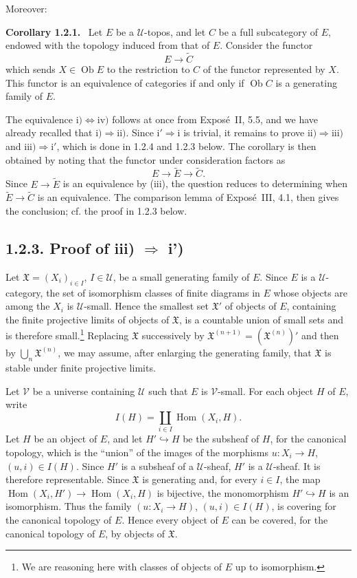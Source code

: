 \documentclass[11pt]{article}
\newcommand{\U}{\mathcal{U}}
\newcommand{\V}{\mathcal{V}}
\newcommand{\Hom}{\operatorname{Hom}}
\newcommand{\Ob}{\operatorname{Ob}}
\newenvironment{statement}[1]{\par\medskip\noindent\textbf{#1.}\ }{\par\medskip}
\begin{document}
Moreover:

\begin{statement}{Corollary 1.2.1}
Let \(E\) be a \(\U\)-topos, and let \(C\) be a full subcategory of \(E\), endowed with the topology induced from that of \(E\). Consider the functor
\[
E\longrightarrow \widetilde C
\]
which sends \(X\in\Ob E\) to the restriction to \(C\) of the functor represented by \(X\). This functor is an equivalence of categories if and only if \(\Ob C\) is a generating family of \(E\).
\end{statement}

The equivalence \(\mathrm{i)}\Leftrightarrow\mathrm{iv)}\) follows at once from Expos\'e~II, 5.5, and we have already recalled that \(\mathrm{i)}\Rightarrow\mathrm{ii)}\). Since \(\mathrm{i'}\Rightarrow\mathrm{i}\) is trivial, it remains to prove \(\mathrm{ii)}\Rightarrow\mathrm{iii)}\) and \(\mathrm{iii)}\Rightarrow\mathrm{i'}\), which is done in 1.2.4 and 1.2.3 below. The corollary is then obtained by noting that the functor under consideration factors as
\[
E\longrightarrow \widetilde E\longrightarrow \widetilde C.
\]
Since \(E\to\widetilde E\) is an equivalence by (iii), the question reduces to determining when \(\widetilde E\to\widetilde C\) is an equivalence. The comparison lemma of Expos\'e~III, 4.1, then gives the conclusion; cf. the proof in 1.2.3 below.

\subsection*{1.2.3. Proof of iii) \(\Rightarrow\) i')}
Let \(\mathfrak X=(X_i)_{i\in I}\), \(I\in\U\), be a small generating family of \(E\). Since \(E\) is a \(\U\)-category, the set of isomorphism classes of finite diagrams in \(E\) whose objects are among the \(X_i\) is \(\U\)-small. Hence the smallest set \(\mathfrak X'\) of objects of \(E\), containing the finite projective limits of objects of \(\mathfrak X\), is a countable union of small sets and is therefore small.\footnote{We are reasoning here with classes of objects of \(E\) up to isomorphism.} Replacing \(\mathfrak X\) successively by \(\mathfrak X^{(n+1)}=(\mathfrak X^{(n)})'\) and then by \(\bigcup_n\mathfrak X^{(n)}\), we may assume, after enlarging the generating family, that \(\mathfrak X\) is stable under finite projective limits.

Let \(\V\) be a universe containing \(\U\) such that \(E\) is \(\V\)-small. For each object \(H\) of \(E\), write
\[
I(H)=\coprod_{i\in I}\Hom(X_i,H).
\]
Let \(H\) be an object of \(E\), and let \(H'\hookrightarrow H\) be the subsheaf of \(H\), for the canonical topology, which is the ``union'' of the images of the morphisms \(u:X_i\to H\), \((u,i)\in I(H)\). Since \(H'\) is a subsheaf of a \(\U\)-sheaf, \(H'\) is a \(\U\)-sheaf. It is therefore representable. Since \(\mathfrak X\) is generating and, for every \(i\in I\), the map \(\Hom(X_i,H')\to\Hom(X_i,H)\) is bijective, the monomorphism \(H'\hookrightarrow H\) is an isomorphism. Thus the family \((u:X_i\to H)\), \((u,i)\in I(H)\), is covering for the canonical topology of \(E\). Hence every object of \(E\) can be covered, for the canonical topology of \(E\), by objects of \(\mathfrak X\).
\end{document}
